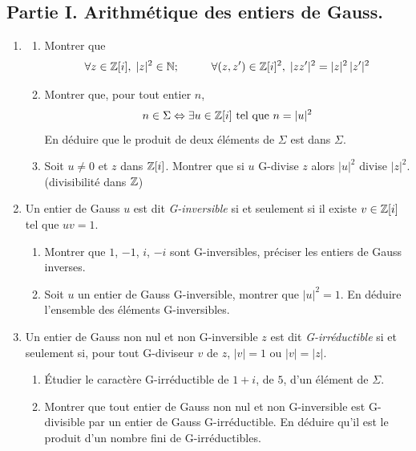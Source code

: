 \subsection*{Partie I. Arithmétique des entiers de Gauss.}
\begin{enumerate}
\item 
\begin{enumerate}
  \item Montrer que 
\begin{displaymath}
\forall z\in \mathbb{Z}[i],\; |z|^2 \in \mathbb{N};\hspace{1cm}
\forall (z,z')\in \mathbb{Z}[i]^2,\;
|zz'|^2 = |z|^2\,|z'|^2
\end{displaymath}
  \item Montrer que, pour tout entier $n$,
\begin{displaymath}
  n\in \Sigma \Leftrightarrow \exists u\in \mathbb{Z}[i]\text{ tel que } n = |u|^2
\end{displaymath}
En déduire que le produit de deux éléments de $\Sigma$ est dans $\Sigma$.
  \item Soit $u\neq 0$ et $z$ dans $\mathbb{Z}[i]$. Montrer que si $u$ G-divise $z$ alors $|u|^2$ divise $|z|^2$. (divisibilité dans $\mathbb{Z}$)
\end{enumerate}

\item Un entier de Gauss $u$ est dit \emph{G-inversible} si et seulement si il existe $v\in \mathbb{Z}[i]$ tel que $uv=1$. 
\begin{enumerate}
  \item Montrer que $1$, $-1$, $i$, $-i$ sont G-inversibles, préciser les entiers de Gauss inverses.
  \item Soit $u$ un entier de Gauss G-inversible, montrer que $|u|^2=1$. En déduire l'ensemble des éléments G-inversibles.
\end{enumerate}

\item Un entier de Gauss non nul et non G-inversible $z$ est dit \emph{G-irréductible} si et seulement si, pour tout G-diviseur $v$ de $z$, $|v|=1$ ou $|v|=|z|$.
\begin{enumerate}
  \item \'Etudier le caractère G-irréductible de $1+i$, de $5$, d'un élément de $\Sigma$.
  \item Montrer que tout entier de Gauss non nul et non G-inversible est G-divisible par un entier de Gauss G-irréductible. En déduire qu'il est le produit d'un nombre fini de G-irréductibles.
\end{enumerate}


\end{enumerate}
